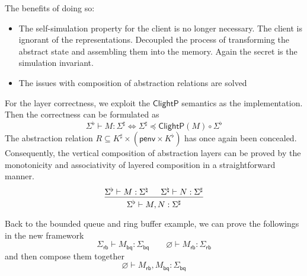\documentclass[acmsmall,screen,review,anonymous]{acmart}
\newcommand{\kw}[1]{\ensuremath{ \mathsf{#1} }}
\renewcommand{\preceq}{\preccurlyeq}
\newcommand{\ClightP}{\ensuremath{ \mathsf{ClightP} }}
\begin{document}
The benefits of doing so:
\begin{itemize}
\item The self-simulation property for the client is no longer necessary.
  The client is ignorant of the representations.
  Decoupled the process of transforming the abstract state
  and assembling them into the memory.
  Again the secret is the simulation invariant.
\item The issues with composition of abstraction relations are solved
\end{itemize}

For the layer correctness,
we exploit the $\ClightP$ semantics as the implementation.
Then the correctness can be formulated as
\[
  \Sigma^\flat \vdash M : \Sigma^\sharp
  \Leftrightarrow
  \Sigma^\sharp \preceq \ClightP(M) \circ \Sigma^\flat
\]
The abstraction relation
$R \subseteq K^\sharp \times (\kw{penv} \times K^\flat)$
has once again been concealed.
Consequently, the vertical composition of abstraction layers
can be proved
by the monotonicity and associativity of layered composition
in a straightforward manner.
\[
  \begin{prooftree}
    \hypo{\Sigma^\flat \vdash M : \Sigma^\natural}
    \hypo{\Sigma^\natural \vdash N : \Sigma^\sharp}
    \infer2{\Sigma^\flat \vdash M, N : \Sigma^\sharp}
  \end{prooftree}
\]

Back to the bounded queue and ring buffer example,
we can prove the followings in the new framework
\[
  \Sigma_\kw{rb} \vdash M_\kw{bq} : \Sigma_\kw{bq}
  \qquad
  \varnothing \vdash M_\kw{rb} : \Sigma_\kw{rb}
\]
and then compose them together
\[
  \varnothing \vdash M_\kw{rb}, M_\kw{bq} : \Sigma_\kw{bq}
\]
\end{document}

